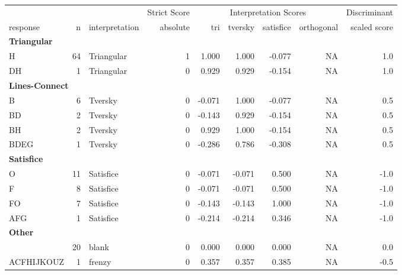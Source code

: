 \documentclass[
  letterpaper,
  DIV=11,
  numbers=noendperiod]{scrreprt}
\begin{document}
\begin{tabular}[t]{l|r|l|r|r|r|r|r|r}
\hline
\multicolumn{3}{c|}{ } & \multicolumn{1}{c|}{Strict Score} & \multicolumn{4}{c|}{Interpretation Scores} & \multicolumn{1}{c}{Discriminant} \\
\cline{4-4} \cline{5-8} \cline{9-9}
response & n & interpretation & absolute & tri & tversky & satisfice & orthogonal & scaled score\\
\hline
\multicolumn{9}{l}{\textbf{Triangular}}\\
\hline
\hspace{1em}H & 64 & Triangular & 1 & 1.000 & 1.000 & -0.077 & NA & 1.0\\
\hline
\hspace{1em}DH & 1 & Triangular & 0 & 0.929 & 0.929 & -0.154 & NA & 1.0\\
\hline
\multicolumn{9}{l}{\textbf{Lines-Connect}}\\
\hline
\hspace{1em}B & 6 & Tversky & 0 & -0.071 & 1.000 & -0.077 & NA & 0.5\\
\hline
\hspace{1em}BD & 2 & Tversky & 0 & -0.143 & 0.929 & -0.154 & NA & 0.5\\
\hline
\hspace{1em}BH & 2 & Tversky & 0 & 0.929 & 1.000 & -0.154 & NA & 0.5\\
\hline
\hspace{1em}BDEG & 1 & Tversky & 0 & -0.286 & 0.786 & -0.308 & NA & 0.5\\
\hline
\multicolumn{9}{l}{\textbf{Satisfice}}\\
\hline
\hspace{1em}O & 11 & Satisfice & 0 & -0.071 & -0.071 & 0.500 & NA & -1.0\\
\hline
\hspace{1em}F & 8 & Satisfice & 0 & -0.071 & -0.071 & 0.500 & NA & -1.0\\
\hline
\hspace{1em}FO & 7 & Satisfice & 0 & -0.143 & -0.143 & 1.000 & NA & -1.0\\
\hline
\hspace{1em}AFG & 1 & Satisfice & 0 & -0.214 & -0.214 & 0.346 & NA & -1.0\\
\hline
\multicolumn{9}{l}{\textbf{Other}}\\
\hline
\hspace{1em} & 20 & blank & 0 & 0.000 & 0.000 & 0.000 & NA & 0.0\\
\hline
\hspace{1em}ACFHIJKOUZ & 1 & frenzy & 0 & 0.357 & 0.357 & 0.385 & NA & -0.5\\

\end{tabular}
\end{document}
